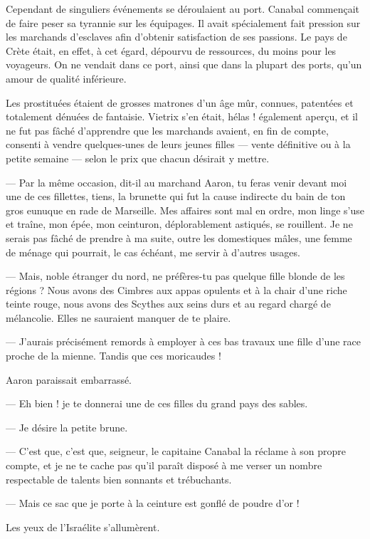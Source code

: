 \documentclass[a4paper, 11pt, oneside, polutonikogreek, french]{article}
\begin{document}
Cependant de singuliers événements se déroulaient au port. Canabal commençait de faire peser sa tyrannie sur les équipages. Il avait spécialement fait pression sur les marchands d'esclaves afin d'obtenir satisfaction de ses passions. Le pays de Crète était, en effet, à cet égard, dépourvu de ressources, du moins pour les voyageurs. On ne vendait dans ce port, ainsi que dans la plupart des ports, qu'un amour de qualité inférieure.

Les prostituées étaient de grosses matrones d'un âge mûr, connues, patentées et totalement dénuées de fantaisie. Vietrix s'en était, hélas ! également aperçu, et il ne fut pas fâché d'apprendre que les marchands avaient, en fin de compte, consenti à vendre quelques-unes de leurs jeunes filles --- vente définitive ou à la petite semaine --- selon le prix que chacun désirait y mettre.

--- Par la même occasion, dit-il au marchand Aaron, tu feras venir devant moi une de ces fillettes, tiens, la brunette qui fut la cause indirecte du bain de ton gros eunuque en rade de Marseille. Mes affaires sont mal en ordre, mon linge s'use et traîne, mon épée, mon ceinturon, déplorablement astiqués, se rouillent. Je ne serais pas fâché de prendre à ma suite, outre les domestiques mâles, une femme de ménage qui pourrait, le cas échéant, me servir à d'autres usages.

--- Mais, noble étranger du nord, ne préfères-tu pas quelque fille blonde de les régions ? Nous avons des Cimbres aux appas opulents et à la chair d'une riche teinte rouge, nous avons des Scythes aux seins durs et au regard chargé de mélancolie. Elles ne sauraient manquer de te plaire.

--- J'aurais précisément remords à employer à ces bas travaux une fille d'une race proche de la mienne. Tandis que ces moricaudes !

Aaron paraissait embarrassé.

--- Eh bien ! je te donnerai une de ces filles du grand pays des sables.

--- Je désire la petite brune.

--- C'est que, c'est que, seigneur, le capitaine Canabal la réclame à son propre compte, et je ne te cache pas qu'il paraît disposé à me verser un nombre respectable de talents bien sonnants et trébuchants.

--- Mais ce sac que je porte à la ceinture est gonflé de poudre d'or !

Les yeux de l'Israélite s'allumèrent.
\end{document}
